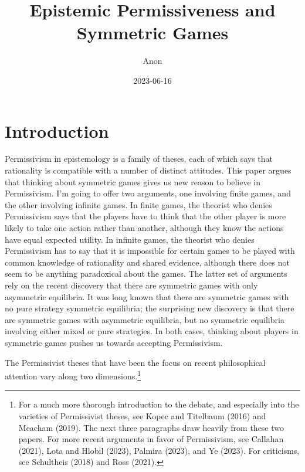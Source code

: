 \documentclass[
  11pt,
]{article}
\title{Epistemic Permissiveness and Symmetric Games}
\author{Anon}
\date{2023-06-16}
\begin{document}
\maketitle

\hypertarget{introduction}{%
\section{Introduction}\label{introduction}}

Permissivism in epistemology is a family of theses, each of which says that rationality is compatible with a number of distinct attitudes. This paper argues that thinking about symmetric games gives us new reason to believe in Permissivism. I'm going to offer two arguments, one involving finite games, and the other involving infinite games. In finite games, the theorist who denies Permissivism says that the players have to think that the other player is more likely to take one action rather than another, although they know the actions have equal expected utility. In infinite games, the theorist who denies Permissivism has to say that it is impossible for certain games to be played with common knowledge of rationality and shared evidence, although there does not seem to be anything paradoxical about the games. The latter set of arguments rely on the recent discovery that there are symmetric games with only asymmetric equilibria. It was long known that there are symmetric games with no pure strategy symmetric equilibria; the surprising new discovery is that there are symmetric games with asymmetric equilibria, but no symmetric equilibria involving either mixed or pure strategies. In both cases, thinking about players in symmetric games pushes us towards accepting Permissivism.

The Permissivist theses that have been the focus on recent philosophical attention vary along two dimensions.\footnote{For a much more thorough introduction to the debate, and especially into the varieties of Permissivist theses, see Kopec and Titelbaum (2016) and Meacham (2019). The next three paragraphs draw heavily from these two papers. For more recent arguments in favor of Permissivism, see Callahan (2021), Lota and Hlobil (2023), Palmira (2023), and Ye (2023). For criticisms, see Schultheis (2018) and Ross (2021).}
\end{document}
